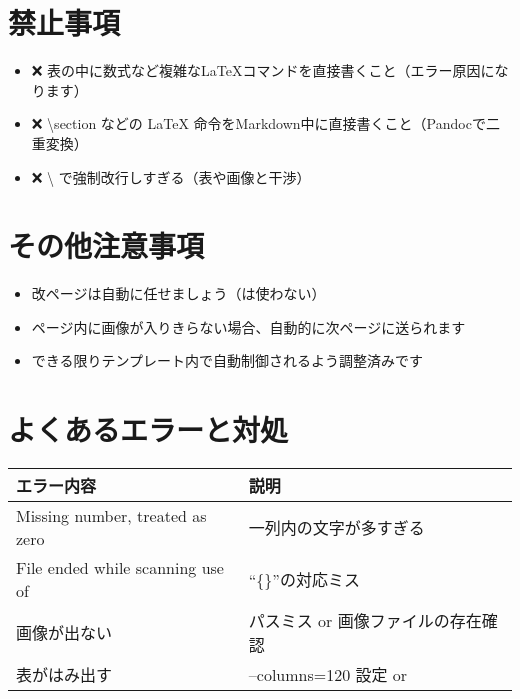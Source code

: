 \documentclass[
  12pt,
  a4paper,
  oneside,
]{article}
\begin{document}
\section{禁止事項}\label{ux7981ux6b62ux4e8bux9805}

\begin{itemize}
\item
  ❌ 表の中に数式など複雑なLaTeXコマンドを直接書くこと（エラー原因になります）
\item
  ❌ \textbackslash section などの LaTeX 命令をMarkdown中に直接書くこと（Pandocで二重変換）
\item
  ❌ \textbackslash{} で強制改行しすぎる（表や画像と干渉）
\end{itemize}

\section{その他注意事項}\label{ux305dux306eux4ed6ux6ce8ux610fux4e8bux9805}

\begin{itemize}
\item
  改ページは自動に任せましょう（\newpage は使わない）
\item
  ページ内に画像が入りきらない場合、自動的に次ページに送られます
\item
  できる限りテンプレート内で自動制御されるよう調整済みです
\end{itemize}

\section{よくあるエラーと対処}\label{ux3088ux304fux3042ux308bux30a8ux30e9ux30fcux3068ux5bfeux51e6}

\begin{longtable}[]{@{}ll@{}}
\toprule\noalign{}
エラー内容 & 説明 \\
\midrule\noalign{}
\endhead
\bottomrule\noalign{}
\endlastfoot
Missing number, treated as zero & 一列内の文字が多すぎる \\
File ended while scanning use of & ``\{\}''の対応ミス \\
画像が出ない & パスミス or 画像ファイルの存在確認 \\
表がはみ出す & --columns=120 設定 or  \\
\end{longtable}
\end{document}

